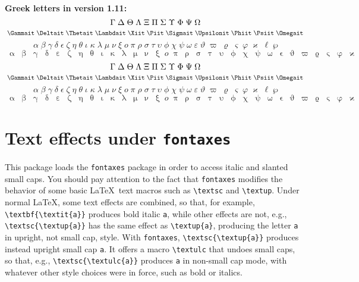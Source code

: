 \documentclass[11pt]{article}
\begin{document}
\def\testupgreekit{%
  \test\Gammait \test\Deltait 
  \test\Thetait \test\Lambdait \test\Xiit \test\Piit \test\Sigmait
  \test\Upsilonit \test\Phiit \test\Psiit \test\Omegait }
\def\testlowgreeki{%
  \test\alpha \test\beta \test\gamma \test\delta \test\epsilon
  \test\zeta \test\eta \test\theta \test\iota \test\kappa \test\lambda
  \test\mu }
\def\testlowgreekii{%
  \test\nu \test\xi \test o \test\pi \test\rho \test\sigma \test\tau
  \test\upsilon \test\phi \test\chi \test\psi \test\omega }
\def\testlowgreekiii{%
  \test\varepsilon \test\vartheta \test\varpi \test\varrho
  \test\varsigma \test\varphi \test\varkappa \test\ell \test\wp}
\def\testlowgreekiu{%
  \test\upalpha \test\upbeta \test\upgamma \test\updelta \test\upepsilon
  \test\upzeta \test\upeta \test\uptheta \test\upiota \test\upkappa \test\uplambda
  \test\upmu }
\def\testlowgreekiiu{%
  \test\upnu \test\upxi \test o \test\uppi \test\uprho \test\upsigma \test\uptau
  \test\upupsilon \test\upphi \test\upchi \test\uppsi \test\upomega }
\def\testlowgreekiiiu{%
  \test\upvarepsilon \test\upvartheta \test\upvarpi \test\upvarrho
  \test\upvarsigma \test\upvarphi \test\upvarkappa}
\def\testlowgreek{%
  \testlowgreeki\testlowgreekii\testlowgreekiii}
\def\testlowgreeku{%
  \testlowgreekiu\testlowgreekiiu\testlowgreekiiiu}
\def\test#1{\; #1}

\textbf{Greek letters in version 1.11:} \[\testupgreek\]
\[\testupgreekit\]
\[\testlowgreek\]
\[\testlowgreeku\]
{\boldmath
\[\testupgreek\]
\[\testupgreekit\]
\[\testlowgreek\]
\[\testlowgreeku\]
}
\section{Text effects under \texttt{fontaxes}}
This package loads the {\tt fontaxes} package in order to access italic and slanted small caps. You should pay attention to the fact that {\tt fontaxes} modifies the behavior of some basic \LaTeX\ text macros such as \verb|\textsc| and \verb|\textup|. Under normal \LaTeX, some text effects are combined, so that, for example, \verb|\textbf{\textit{a}}| produces bold italic {\tt a}, while other effects are not, e.g., \verb|\textsc{\textup{a}}| has the same effect as \verb|\textup{a}|, producing the letter {\tt a} in upright, not small cap, style. With {\tt fontaxes}, \verb|\textsc{\textup{a}}| produces instead upright small cap {\tt a}. It offers a macro \verb|\textulc| that undoes small caps, so that, e.g., \verb|\textsc{\textulc{a}}| produces {\tt a} in non-small cap mode, with whatever other style choices were in force, such as bold or italics.
\end{document}
